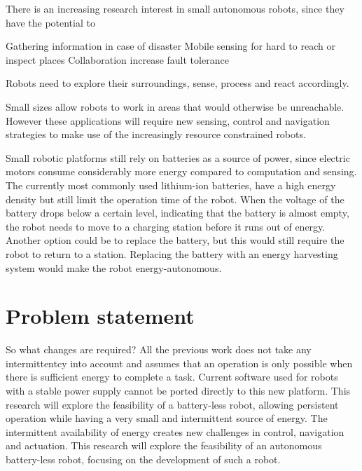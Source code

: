 There is an increasing research interest in small autonomous robots, since they have the potential to 



Gathering information in case of disaster
Mobile sensing for hard to reach or inspect places
Collaboration increase fault tolerance


Robots need to explore their surroundings, sense, process and react accordingly.	


Small sizes allow robots to work in areas that would otherwise be unreachable. 
However these applications will require new sensing, control and navigation strategies to make use of the increasingly resource constrained robots.

Small robotic platforms still rely on batteries as a source of power, since electric motors consume considerably more energy compared to computation and sensing.
The currently most commonly used lithium-ion batteries, have a high energy density but still limit the operation time of the robot.
When the voltage of the battery drops below a certain level, indicating that the battery is almost empty, the robot needs to move to a charging station before it runs out of energy.
Another option could be to replace the battery, but this would still require the robot to return to a station.
Replacing the battery with an energy harvesting system would make the robot energy-autonomous. 


\section{Problem statement}


So what changes are required?
All the previous work does not take any intermittentcy into account and assumes that an operation is only possible when there is sufficient energy to complete a task.
Current software used for robots with a stable power supply cannot be ported directly to this new platform.
This research will explore the feasibility of a battery-less robot, allowing persistent operation while having a very small and intermittent source of energy.
The intermittent availability of energy creates new challenges in control, navigation and actuation. 
This research will explore the feasibility of an autonomous battery-less robot, focusing on the development of such a robot.


